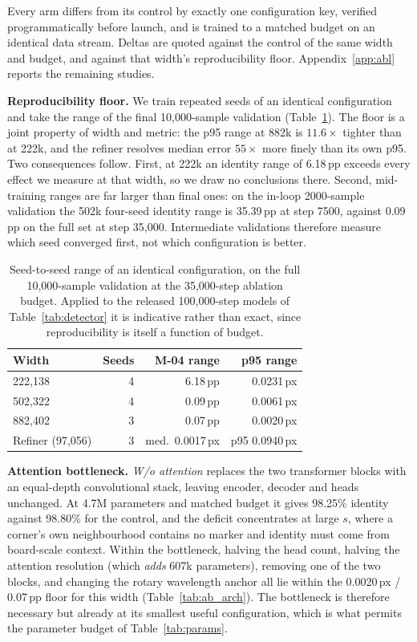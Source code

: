 \documentclass[10pt,twocolumn,letterpaper]{article}
\begin{document}
Every arm differs from its control by exactly one configuration key, verified programmatically
before launch, and is trained to a matched budget on an identical data stream. Deltas are quoted
against the control of the same width and budget, and against that width's reproducibility floor.
Appendix~\ref{app:abl} reports the remaining studies.

\textbf{Reproducibility floor.}
\label{sec:abl_floor}
We train repeated seeds of an identical configuration and take the range of the final
10,000-sample validation (Table~\ref{tab:floor}). The floor is a joint property of width and
metric: the p95 range at 882k is $11.6\times$ tighter than at 222k, and the refiner resolves median
error $55\times$ more finely than its own p95. Two consequences follow. First, at 222k an identity
range of 6.18\,pp exceeds every effect we measure at that width, so we draw no conclusions there.
Second, mid-training ranges are far larger than final ones: on the in-loop 2000-sample validation
the 502k four-seed identity range is 35.39\,pp at step 7500, against 0.09\,pp on the full set at
step 35,000. Intermediate validations therefore measure which seed converged first, not which
configuration is better.

\begin{table}[t]
\centering\small
\begin{tabular}{lrrr}
\toprule
Width & Seeds & M-04 range & p95 range \\
\midrule
222,138 & 4 & 6.18\,pp & 0.0231\,px \\
502,322 & 4 & 0.09\,pp & 0.0061\,px \\
882,402 & 3 & 0.07\,pp & 0.0020\,px \\
Refiner (97,056) & 3 & med.\ 0.0017\,px & p95 0.0940\,px \\
\bottomrule
\end{tabular}
\caption{Seed-to-seed range of an identical configuration, on the full 10,000-sample validation
at the 35,000-step ablation budget. Applied to the released 100,000-step models of
Table~\ref{tab:detector} it is indicative rather than exact, since reproducibility is itself a
function of budget.}
\label{tab:floor}
\end{table}

\textbf{Attention bottleneck.}
\label{sec:abl_attn}
\emph{W/o attention} replaces the two transformer blocks with an equal-depth convolutional stack,
leaving encoder, decoder and heads unchanged. At 4.7M parameters and matched budget it gives
98.25\% identity against 98.80\% for the control, and the deficit concentrates at large $s$, where
a corner's own neighbourhood contains no marker and identity must come from board-scale context.
Within the bottleneck, halving the head count, halving the attention resolution (which \emph{adds}
607k parameters), removing one of the two blocks, and changing the rotary wavelength anchor all lie
within the 0.0020\,px / 0.07\,pp floor for this width (Table~\ref{tab:ab_arch}). The bottleneck is
therefore necessary but already at its smallest useful configuration, which is what permits the
parameter budget of Table~\ref{tab:params}.
\end{document}
